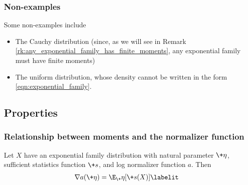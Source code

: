 \documentclass{article} %
\newcommand{\obsCaps}{X}
\newcommand{\logNormalizerFunction}{a}
\newcommand{\sufficientStatsFunction}{\+s}
\newcommand{\naturalParam}{\+\eta}
\begin{document}
\subsubsection{Non-examples}

Some non-examples include 
\begin{itemize}
\item The Cauchy distribution (since, as we will see in Remark \ref{rk:any_exponential_family_has_finite_moments}, any exponential family must have finite moments)
\item The uniform distribution, whose density cannot be written in the form \eqref{eqn:exponential_family}. %
\end{itemize}


\subsection{Properties}

\subsubsection{Relationship between moments and the normalizer function} \label{sec:relationship_between_moments_and_normalizer}

\begin{proposition}
Let $X$ have an exponential family distribution with natural parameter $\naturalParam$, sufficient statistics function $\sufficientStatsFunction$, and log normalizer function $\logNormalizerFunction$.   Then  
\begin{align*}
\nabla \logNormalizerFunction(\naturalParam) = \E_\naturalParam[\sufficientStatsFunction(\obsCaps)] 
\labelit \label{eqn:expected_sufficient_statistic_as_derivative_of_log_normalizer}	
\end{align*}
\label{prop:expected_sufficient_statistic_as_derivative_of_log_normalizer}
\end{proposition}
\end{document}
